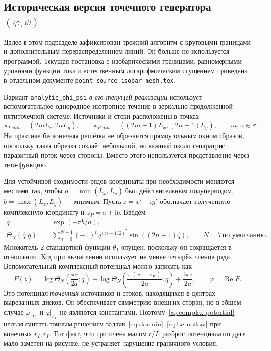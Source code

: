 \documentclass[12pt,a4paper]{article}
\begin{document}
\subsection{Историческая версия точечного генератора
\texorpdfstring{$(\varphi,\psi)$}{(phi, psi)}}

Далее в этом подразделе зафиксирован прежний алгоритм с круговыми границами и
дополнительным перераспределением линий. Он больше не используется программой.
Текущая постановка с изобарическими границами, равномерными уровнями функции
тока и естественным логарифмическим сгущением приведена в отдельном документе
\texttt{point\_source\_isobar\_mesh.tex}.

Вариант \texttt{analytic\_phi\_psi} \emph{в его текущей реализации} использует вспомогательное однородное
изотропное течение в зеркально продолженной пятиточечной системе. Источники
и стоки расположены в точках
\begin{equation}
 \mathbf x_{I,mn}=(2mL_x,2nL_y),\qquad
 \mathbf x_{P,mn}=((2m+1)L_x,(2n+1)L_y),\qquad m,n\in\mathbb Z.
\end{equation}
На практике бесконечная
решётка не обрезается прямоугольным окном образов, поскольку такая обрезка
создаёт небольшой, но важный около сепаратрис паразитный поток через стороны.
Вместо этого используется представление через тета-функцию.

Для устойчивой сходимости рядов координаты при необходимости меняются
местами так, чтобы $a=\min(L_x,L_y)$ был действительным полупериодом,
$b=\max(L_x,L_y)$ --- мнимым. Пусть $z=x'+\mathrm i y'$ обозначает
полученную комплексную координату и $z_P=a+\mathrm i b$. Введём
\begin{align}
 q&=\exp(-\pi b/a),\\
 \Theta_N(\zeta;q)&=\sum_{n=0}^{N-1}(-1)^n
 q^{(n+1/2)^2}\sin((2n+1)\zeta),\qquad N=7\ \text{по умолчанию}.
 \label{eq:theta}
\end{align}
Множитель $2$ стандартной функции $\theta_1$ опущен, поскольку он
сокращается в отношении. Код при вычислении использует не менее четырёх
членов ряда. Вспомогательный комплексный потенциал можно записать как
\begin{equation}
 F(z)=\log\Theta_N\!\left(\frac{\pi z}{2a};q\right)
 -\log\Theta_N\!\left(\frac{\pi(z-z_P)}{2a};q\right)
 +\frac{\mathrm i\pi z}{2a},\qquad
 \varphi=\operatorname{Re}F.
 \label{eq:complex-potential}
\end{equation}
Это потенциал \emph{точечных} источников и стоков, находящихся в центрах
вырезанных дисков. Он обеспечивает симметрию внешних сторон, но в общем
случае $\varphi|_{\Gamma_I}$ и $\varphi|_{\Gamma_P}$ не являются
константами. Поэтому~\eqref{eq:complex-potential} нельзя считать точным
решением задачи~\eqref{eq:domain}--\eqref{eq:bc-noflow} при конечных
$r_I,r_P$. Тот факт, что при очень малом $r/L$ разброс потенциала по дуге
мало заметен на рисунке, не устраняет нарушение граничного условия.
\end{document}
